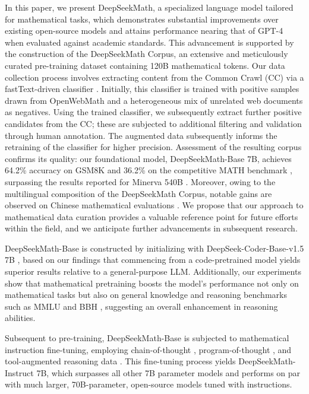 In this paper, we present DeepSeekMath, a specialized language model tailored for mathematical tasks, which demonstrates substantial improvements over existing open-source models and attains performance nearing that of GPT-4 when evaluated against academic standards. This advancement is supported by the construction of the DeepSeekMath Corpus, an extensive and meticulously curated pre-training dataset containing 120B mathematical tokens. Our data collection process involves extracting content from the Common Crawl (CC) via a fastText-driven classifier \citep{joulin2016fasttext}. Initially, this classifier is trained with positive samples drawn from OpenWebMath \citep{openwebmath} and a heterogeneous mix of unrelated web documents as negatives. Using the trained classifier, we subsequently extract further positive candidates from the CC; these are subjected to additional filtering and validation through human annotation. The augmented data subsequently informs the retraining of the classifier for higher precision. Assessment of the resulting corpus confirms its quality: our foundational model, DeepSeekMath-Base 7B, achieves 64.2\% accuracy on GSM8K \citep{gsm8k} and 36.2\% on the competitive MATH benchmark \citep{MATH}, surpassing the results reported for Minerva 540B \citep{minerva}. Moreover, owing to the multilingual composition of the DeepSeekMath Corpus, notable gains are observed on Chinese mathematical evaluations \citep{wei2023cmath,agieval}. We propose that our approach to mathematical data curation provides a valuable reference point for future efforts within the field, and we anticipate further advancements in subsequent research.

DeepSeekMath-Base is constructed by initializing with DeepSeek-Coder-Base-v1.5 7B \citep{deepseek-coder}, based on our findings that commencing from a code-pretrained model yields superior results relative to a general-purpose LLM. Additionally, our experiments show that mathematical pretraining boosts the model’s performance not only on mathematical tasks but also on general knowledge and reasoning benchmarks such as MMLU \citep{mmlu} and BBH \citep{bbh}, suggesting an overall enhancement in reasoning abilities.

Subsequent to pre-training, DeepSeekMath-Base is subjected to mathematical instruction fine-tuning, employing chain-of-thought \citep{cot}, program-of-thought \citep{pot,pal}, and tool-augmented reasoning data \citep{tora}. This fine-tuning process yields DeepSeekMath-Instruct 7B, which surpasses all other 7B parameter models and performs on par with much larger, 70B-parameter, open-source models tuned with instructions.

